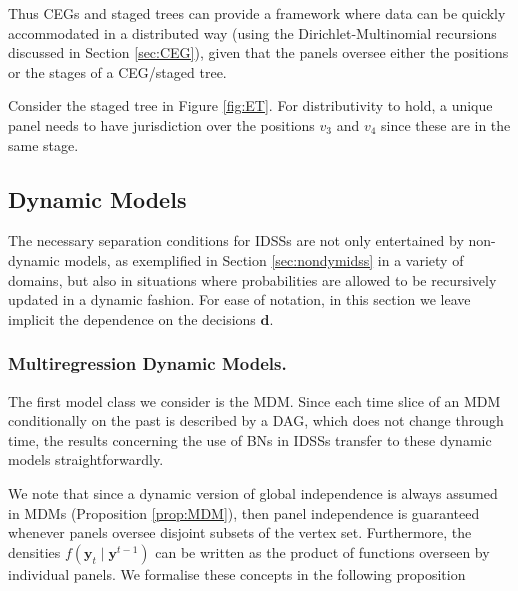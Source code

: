  Thus CEGs and staged trees can provide a framework where data can be quickly accommodated in a distributed way (using the Dirichlet-Multinomial recursions discussed in Section \ref{sec:CEG}), given that the panels oversee either the positions or the stages of a CEG/staged tree. 

\begin{example}
Consider the staged tree in Figure \ref{fig:ET}. For distributivity to hold, a unique panel needs to have jurisdiction over the positions $v_3$ and $v_4$ since these are in the same stage.
\end{example}
\subsection{Dynamic Models}

The necessary separation conditions for IDSSs are not only entertained by non-dynamic models, as exemplified in Section \ref{sec:nondymidss} in a variety of domains, but also in situations where probabilities are allowed to be recursively updated in a dynamic fashion. For ease of notation, in this section we leave implicit the dependence on the decisions $\bm{d}$.

\subsubsection{Multiregression Dynamic Models.} 
The first model class we consider is the MDM. Since each time slice of an MDM conditionally on the past is described by a DAG, which does not change through time, the results concerning the use of BNs in IDSSs transfer to these dynamic models straightforwardly. 

We note that since a dynamic version of global independence is always assumed in MDMs (Proposition \ref{prop:MDM}), then panel independence is guaranteed whenever panels oversee disjoint subsets of the vertex set. Furthermore, the densities $f(\bm{y}_t\;|\;\bm{y}^{t-1})$ can be written as the product of functions overseen by individual panels. We formalise these concepts in the following proposition

